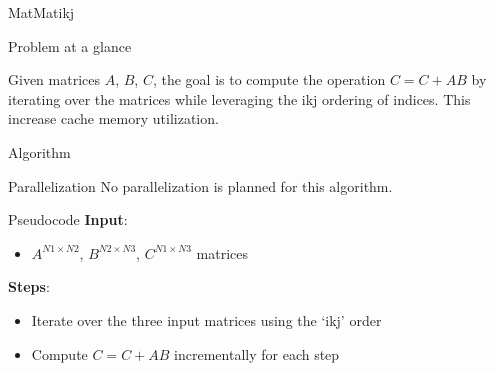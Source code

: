 \begin{chapter}{MatMatikj}
    \begin{section}{Problem at a glance}
        \par Given matrices $A$, $B$, $C$, the goal is to compute the  operation $C = C + AB$ by iterating over the matrices while leveraging the ikj ordering of indices. This increase cache memory utilization.
    \end{section}
    \begin{section}{Algorithm}
        \begin{subsection}{Parallelization}
            No parallelization is planned for this algorithm.
        \end{subsection}
        \begin{subsection}{Pseudocode}
            \textbf{Input}:
            \begin{itemize}
                \item $A^{N1 \times N2}$, $B^{N2 \times N3}$, $C^{N1 \times N3}$ matrices
            \end{itemize}
            \textbf{Steps}:
            \begin{itemize}
                \item Iterate over the three input matrices using the `ikj' order
                \item Compute $C = C + AB$ incrementally for each step
            \end{itemize}
            
        \end{subsection}
    \end{section}
\end{chapter}